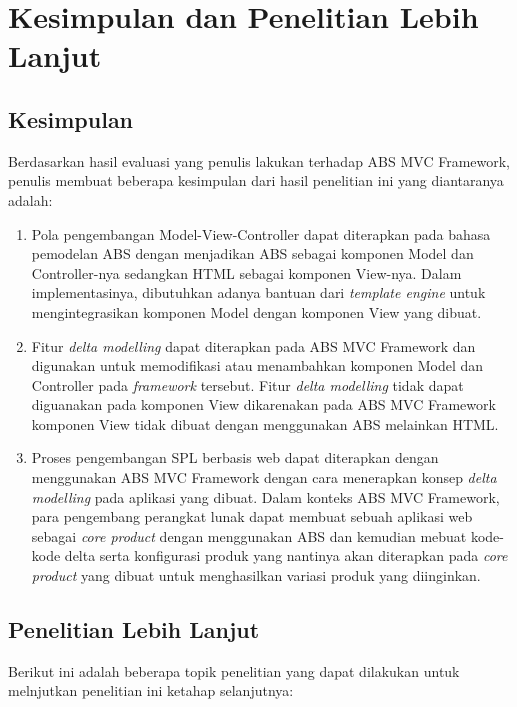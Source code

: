 \chapter{Kesimpulan dan Penelitian Lebih Lanjut}

\section{Kesimpulan}
Berdasarkan hasil evaluasi yang penulis lakukan terhadap ABS MVC Framework, penulis membuat beberapa kesimpulan dari hasil penelitian ini yang diantaranya adalah:

\begin{enumerate}
    \item Pola pengembangan Model-View-Controller dapat diterapkan pada bahasa pemodelan ABS dengan menjadikan ABS sebagai komponen Model dan Controller-nya sedangkan HTML sebagai komponen View-nya. Dalam implementasinya, dibutuhkan adanya bantuan dari \textit{template engine} untuk mengintegrasikan komponen Model dengan komponen View yang dibuat.
    \item Fitur \textit{delta modelling} dapat diterapkan pada ABS MVC Framework dan digunakan untuk memodifikasi atau menambahkan komponen Model dan Controller pada \textit{framework} tersebut. Fitur \textit{delta modelling} tidak dapat diguanakan pada komponen View dikarenakan pada ABS MVC Framework komponen View tidak dibuat dengan menggunakan ABS melainkan HTML.
    \item Proses pengembangan SPL berbasis web dapat diterapkan dengan menggunakan ABS MVC Framework dengan cara menerapkan konsep \textit{delta modelling} pada aplikasi yang dibuat. Dalam konteks ABS MVC Framework, para pengembang perangkat lunak dapat membuat sebuah aplikasi web sebagai \textit{core product} dengan menggunakan ABS dan kemudian mebuat kode-kode delta serta konfigurasi produk yang nantinya akan diterapkan pada \textit{core product} yang dibuat untuk menghasilkan variasi produk yang diinginkan.
\end{enumerate}

\section{Penelitian Lebih Lanjut}
Berikut ini adalah beberapa topik penelitian yang dapat dilakukan untuk melnjutkan penelitian ini ketahap selanjutnya:

